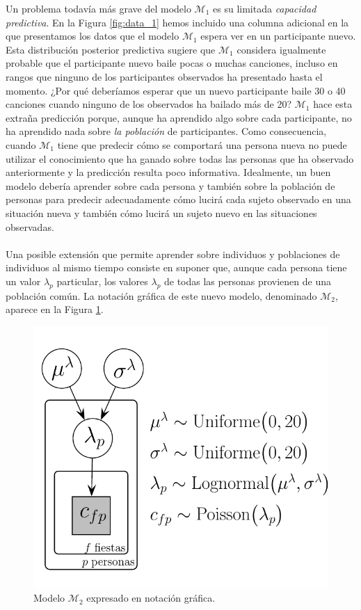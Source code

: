\documentclass{article}
\begin{document}
\indent Un problema todavía más grave del modelo $\mathcal M_1$ es su limitada \emph{capacidad predictiva}. En la Figura \ref{fig:data_1} hemos incluido una columna adicional en la que presentamos los datos que el modelo $\mathcal M_1$ espera ver en un participante nuevo. Esta distribución posterior predictiva sugiere que $\mathcal M_1$ considera igualmente probable que el participante nuevo baile pocas o muchas canciones, incluso en rangos que ninguno de los participantes observados ha presentado hasta el momento. ¿Por qué deberíamos esperar que un nuevo participante baile 30 o 40 canciones cuando ninguno de los observados ha bailado más de 20? $\mathcal M_1$ hace esta extraña predicción porque, aunque ha aprendido algo sobre cada participante, no ha aprendido nada sobre \emph{la población} de participantes. Como consecuencia, cuando $\mathcal M_1$ tiene que predecir cómo se comportará una persona nueva no puede utilizar el conocimiento que ha ganado sobre todas las personas que ha observado anteriormente y la predicción resulta poco informativa. Idealmente, un buen modelo debería aprender sobre cada persona y también sobre la población de personas para predecir adecuadamente cómo lucirá cada sujeto observado en una situación nueva y también cómo lucirá un sujeto nuevo en las situaciones observadas.\\\\
\indent Una posible extensión que permite aprender sobre individuos y poblaciones de individuos al mismo tiempo consiste en suponer que, aunque cada persona tiene un valor $\lambda_p$ particular, los valores $\lambda_p$ de todas las personas provienen de una población común. La notación gráfica de este nuevo modelo, denominado $\mathcal M_2$, aparece en la Figura \ref{fig:m_2}.

\begin{figure}[H]
\centerline{\includegraphics[width=.7\textwidth]{m_2.pdf}}
\caption{Modelo $\mathcal M_2$ expresado en notación gráfica.}
\label{fig:m_2}
\end{figure}
\end{document}
